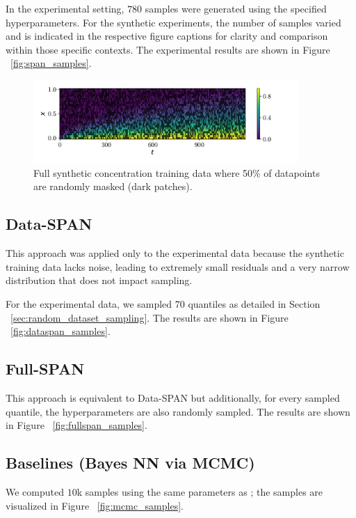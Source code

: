 In the experimental setting, $780$ samples were generated using the specified hyperparameters. For the synthetic experiments, the number of samples varied and is indicated in the respective figure captions for clarity and comparison within those specific contexts. The experimental results are shown in Figure ~\vref{fig:span_samples}.

\begin{figure}
    \centering
    \includegraphics[width=0.9\textwidth]{figs/c_diss_field_train_random_subset.pdf}
    \caption{Full synthetic concentration training data where 50\% of datapoints are randomly masked (dark patches).}
    \label{fig:training_data_mask}
\end{figure}


\subsection{Data-SPAN}
This approach was applied only to the experimental data because the synthetic training data lacks noise, leading to extremely small residuals and a very narrow distribution that does not impact sampling.

For the experimental data, we sampled $70$ quantiles as detailed in Section ~\vref{sec:random_dataset_sampling}. The results are shown in Figure ~\vref{fig:dataspan_samples}.



\subsection{Full-SPAN}
This approach is equivalent to Data-SPAN but additionally, for every sampled quantile, the hyperparameters are also randomly sampled. The results are shown in Figure ~\vref{fig:fullspan_samples}.


\subsection{Baselines (Bayes NN via MCMC)}
We computed $10$k samples using the same parameters as \cite{finn}; the samples are visualized in Figure ~\vref{fig:mcmc_samples}.

